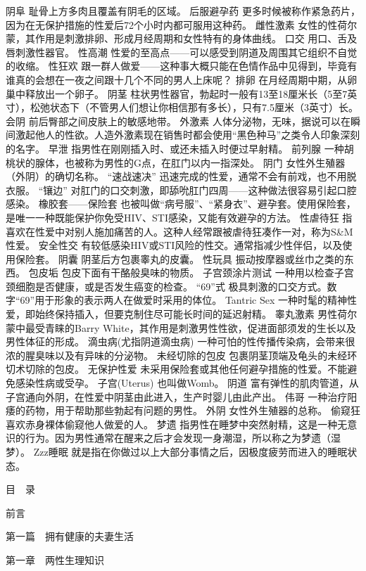 \documentclass[12pt,UTF8]{ctexbook}
\begin{document}
阴阜
耻骨上方多肉且覆盖有阴毛的区域。
后服避孕药
更多时候被称作紧急药片，因为在无保护措施的性爱后72个小时内都可服用这种药。
雌性激素
女性的性荷尔蒙，其作用是刺激排卵、形成月经周期和女性特有的身体曲线。
口交
用口、舌及唇刺激性器官。
性高潮
性爱的至高点——可以感受到阴道及周围其它组织不自觉的收缩。
性狂欢
跟一群人做爱——这种事大概只能在色情作品中见得到，毕竟有谁真的会想在一夜之间跟十几个不同的男人上床呢？
排卵
在月经周期中期，从卵巢中释放出一个卵子。
阴茎
柱状男性器官，勃起时一般有13至18厘米长（5至7英寸），松弛状态下（不管男人们想让你相信那有多长），只有7.5厘米（3英寸）长。
会阴
前后臀部之间皮肤上的敏感地带。
外激素
人体分泌物，无味，据说可以在瞬间激起他人的性欲。人造外激素现在销售时都会使用“黑色种马”之类令人印象深刻的名字。
早泄
指男性在刚刚插入时、或还未插入时便过早射精。
前列腺
一种胡桃状的腺体，也被称为男性的G点，在肛门以内一指深处。
阴门
女性外生殖器（外阴）的确切名称。
“速战速决”
迅速完成的性爱，通常不会有前戏，也不用脱衣服。
“镶边”
对肛门的口交刺激，即舔吮肛门四周——这种做法很容易引起口腔感染。
橡胶套——保险套
也被叫做“病号服”、“紧身衣”、避孕套。使用保险套，是唯一一种既能保护你免受HIV、STI感染，又能有效避孕的方法。
性虐待狂
指喜欢在性爱中对别人施加痛苦的人。这种人经常跟被虐待狂凑作一对，称为S\&M性爱。
安全性交
有较低感染HIV或STI风险的性交。通常指减少性伴侣，以及使用保险套。
阴囊
阴茎后方包裹睾丸的皮囊。
性玩具
振动按摩器或丝巾之类的东西。
包皮垢
包皮下面有干酪般臭味的物质。
子宫颈涂片测试
一种用以检查子宫颈细胞是否健康，或是否发生癌变的检查。
“69”式
极具刺激的口交方式。数字“69”用于形象的表示两人在做爱时采用的体位。
Tantric Sex
一种时髦的精神性爱，即始终保持插入，但要克制住尽可能长时间的延迟射精。
睾丸激素
男性荷尔蒙中最受青睐的Barry White，其作用是刺激男性性欲，促进面部须发的生长以及男性体征的形成。
滴虫病(尤指阴道滴虫病)
一种可怕的性传播传染病，会带来很浓的腥臭味以及有异味的分泌物。
未经切除的包皮
包裹阴茎顶端及龟头的未经环切术切除的包皮。
无保护性爱
未采用保险套或其他任何避孕措施的性爱。不能避免感染性病或受孕。
子宫(Uterus)
也叫做Womb。
阴道
富有弹性的肌肉管道，从子宫通向外阴，在性爱中阴茎由此进入，生产时婴儿由此产出。
伟哥
一种治疗阳痿的药物，用于帮助那些勃起有问题的男性。
外阴
女性外生殖器的总称。
偷窥狂
喜欢赤身裸体偷窥他人做爱的人。
梦遗
指男性在睡梦中突然射精，这是一种无意识的行为。因为男性通常在醒来之后才会发现一身潮湿，所以称之为梦遗（湿梦）。
Zzz睡眠
就是指在你做过以上大部分事情之后，因极度疲劳而进入的睡眠状态。

目　录

前言

第一篇　拥有健康的夫妻生活

第一章　两性生理知识
\end{document}

